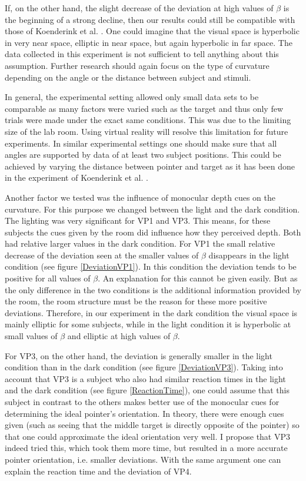 If, on the other hand, the slight decrease of the deviation at high values of $\beta$ is the beginning of a strong decline, then our results could still be compatible with those of Koenderink et al. \citeyear{Koenderink.2000}. One could imagine that the visual space is hyperbolic in very near space, elliptic in near space, but again hyperbolic in far space. The data collected in this experiment is not sufficient to tell anything about this assumption. Further research should again focus on the type of curvature depending on the angle or the distance between subject and stimuli.

In general, the experimental setting allowed only small data sets to be comparable as many factors were varied such as the target and thus only few trials were made under the exact same conditions. This was due to the limiting size of the lab room. Using virtual reality will resolve this limitation for future experiments. In similar experimental settings one should make sure that all angles are supported by data of at least two subject positions. This could be achieved by varying the distance between pointer and target as it has been done in the experiment of Koenderink et al. \citeyear{Koenderink.2000}.

Another factor we tested was the influence of monocular depth cues on the curvature. For this purpose we changed between the light and the dark condition. The lighting was very significant for VP1 and VP3. This means, for these subjects the cues given by the room did influence how they perceived depth. Both had relative larger values in the dark condition. For VP1 the small relative decrease of the deviation seen at the smaller values of $\beta$ disappears in the light condition (see figure \ref{DeviationVP1}). In this condition the deviation tends to be positive for all values of $\beta$. An explanation for this cannot be given easily. But as the only difference in the two conditions is the additional information provided by the room, the room structure must be the reason for these more positive deviations. Therefore, in our experiment in the dark condition the visual space is mainly elliptic for some subjects, while in the light condition it is hyperbolic at small values of $\beta$ and elliptic at high values of $\beta$.

For VP3, on the other hand, the deviation is generally smaller in the light condition than in the dark condition (see figure \ref{DeviationVP3}). Taking into account that VP3 is a subject who also had similar reaction times in the light and the dark condition (see figure \ref{ReactionTime}), one could assume that this subject in contrast to the others makes better use of the monocular cues for determining the ideal pointer's orientation. In theory, there were enough cues given (such as seeing that the middle target is directly opposite of the pointer) so that one could approximate the ideal orientation very well. I propose that VP3 indeed tried this, which took them more time, but resulted in a more accurate pointer orientation, i.e. smaller deviations. With the same argument one can explain the reaction time and the deviation of VP4.

